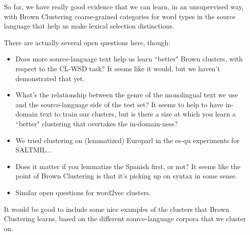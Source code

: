 
So far, we have really good evidence that we can learn, in an unsupervised way,
with Brown Clustering coarse-grained categories for word types in the source
language that help us make lexical selection distinctions.

There are actually several open questions here, though:

\begin{itemize}
  \item Does more source-language text help us learn ``better" Brown clusters,
    with respect to the CL-WSD task? It seems like it would, but we haven't
    demonstrated that yet.
  \item What's the relationship between the genre of the monolingual text we
    use and the source-language side of the test set? It seems to help to have
    in-domain text to train our clusters, but is there a size at which you
    learn a ``better" clustering that overtakes the in-domain-ness?
  \item We tried clustering on (lemmatized) Europarl in the es-qu experiments for SALTMIL...
  \item Does it matter if you lemmatize the Spanish first, or not? It seems
    like the point of Brown Clustering is that it's picking up on syntax in
    some sense.
  \item Similar open questions for word2vec clusters.
\end{itemize}

It would be good to include some nice examples of the clusters that Brown
Clustering learns, based on the different source-language corpora that we
cluster on.


